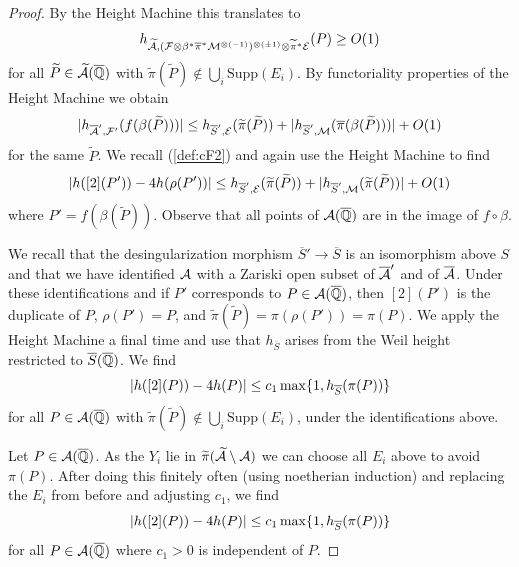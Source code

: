\begin{proof}
By the Height Machine this translates to 
 \begin{equation*}
   h_{\widetilde {\mathcal{A}},(\mathcal{F}\otimes\beta^*\overline\pi^*\mathcal{M}^{\otimes(-1)} 
 )^{\otimes(\pm 1)}\otimes \widetilde\pi^*\mathcal{E}}(P)\ge O(1)
 \end{equation*}
 for all $\widetilde P\in \widetilde{\mathcal{A}}({\overline{\mathbb{Q}}})$ 
with $\widetilde\pi(\widetilde P)\not\in\bigcup_i \mathrm{Supp}(E_i)$. 
By functoriality properties of  the Height Machine we obtain 
 \begin{equation*}
  |h_{\overline {\mathcal{A}}',{\mathcal F}'}(f(\beta(\widetilde P)))| \le h_{\overline S',{\mathcal E}}(\widetilde\pi(\widetilde P)) + |h_{\overline
    S', {\mathcal M}}(\overline{\pi}(\beta(\widetilde P)))|
  +O(1)
 \end{equation*}
 for the same $\widetilde P$. 
 We recall (\ref{def:cF2}) and again use the Height Machine to find
 \begin{equation*}
\left|   h([2](P')) - 4
   h(\rho(P'))\right|   \le h_{\overline
   S',{\mathcal E}}(\widetilde\pi(\widetilde P)) + |h_{\overline S',
     {\mathcal M}}(\widetilde\pi(\widetilde P))|
  +O(1)
 \end{equation*}
where $P'=f(\beta(\widetilde P))$. Observe that all points of $\mathcal{A}({\overline{\mathbb{Q}}})$ are
in the image of $f\circ \beta$. 

We recall that the desingularization morphism $\overline S'\rightarrow\overline S$ is an
isomorphism above $S$ and that we have identified $\mathcal{A}$ with a Zariski
open subset of $\overline{\mathcal{A}}'$ and of $\overline{\mathcal{A}}$.
Under these identifications and if $P'$ corresponds to $P\in
\mathcal{A}({\overline{\mathbb{Q}}})$, then $[2](P')$ is the duplicate of $P$,
$\rho(P')= P$, and $\widetilde\pi(\widetilde P) = \pi(\rho(P'))=\pi(P)$.  We apply the Height
 Machine a final time and use that $h_{\overline S}$ arises from the
 Weil height restricted to $\overline{S}({\overline{\mathbb{Q}}})$. We
 find 
 \begin{equation*}
\left|   h([2](P)) - 4
   h(P)\right|   \le c_1
 \max\{1,h_{\overline S}(\pi(P))\}
 \end{equation*}
 for all $P\in \mathcal{A}({\overline{\mathbb{Q}}})$   with  $\widetilde\pi(\widetilde
 P)\not\in \bigcup_i \mathrm{Supp}(E_i)$, under the identifications
 above. 

Let $P\in\mathcal{A}({\overline{\mathbb{Q}}})$. As the $Y_i$ lie in $\widetilde\pi(\widetilde{\mathcal{A}}\setminus
\mathcal{A})$ we can choose all $E_i$ above to avoid $\pi(P)$.  After doing this finitely often (using
noetherian induction) and replacing the $E_i$ from before and
adjusting $c_1$, we find 
\begin{equation*}
\left|   h([2](P)) - 4
   h(P)\right|  \le c_1 \max\{1,h_{\overline S}(\pi(P))\}
\end{equation*}
for all $P\in \mathcal{A}({\overline{\mathbb{Q}}})$ where $c_1>0$ is independent of $P$.
\end{proof}


